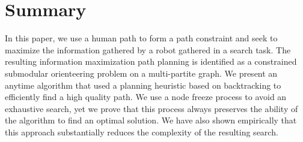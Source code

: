 \section{Summary}
\label{sec:summary}

In this paper, we use a human path to form a path constraint and seek to maximize the information gathered by a robot gathered in a search task.
The resulting information maximization path planning is identified as a constrained submodular orienteering problem on a multi-partite graph.
We present an anytime algorithm that used a planning heuristic based on backtracking to efficiently find a high quality path.
We use a node freeze process to avoid an exhaustive search, yet we prove that this process always preserves the ability of the algorithm to find an optimal solution.
We have also shown empirically that this approach substantially reduces the complexity of the resulting search.